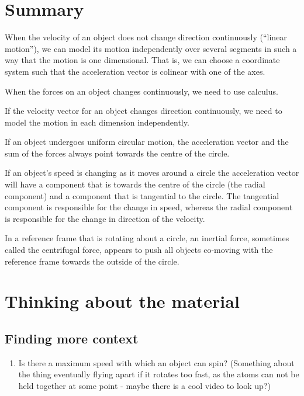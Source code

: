 \section{Summary}
\vspace{1cm}
\begin{chapterSummary}
{
\item When the velocity of an object does not change direction continuously (``linear motion''), we can model its motion independently over several segments in such a way that the motion is one dimensional. That is, we can choose a coordinate system such that the acceleration vector is colinear with one of the axes.
\item When the forces on an object changes continuously, we need to use calculus. 
\item If the velocity vector for an object changes direction continuously, we need to model the motion in each dimension independently.
\item If an object undergoes uniform circular motion, the acceleration vector and the sum of the forces always point towards the centre of the circle.
\item If an object's speed is changing as it moves around a circle the acceleration vector will have a component that is towards the centre of the circle (the radial component) and a component that is tangential to the circle. The tangential component is responsible for the change in speed, whereas the radial component is responsible for the change in direction of the velocity.
\item In a reference frame that is rotating about a circle, an inertial force, sometimes called the centrifugal force, appears to push all objects co-moving with the reference frame towards the outside of the circle.
}
\end{chapterSummary}


\section{Thinking about the material}

\subsection{Finding more context}
\begin{enumerate}
\item Is there a maximum speed with which an object can spin? (Something about the thing eventually flying apart if it rotates too fast, as the atoms can not be held together at some point - maybe there is a cool video to look up?)
\end{enumerate}

